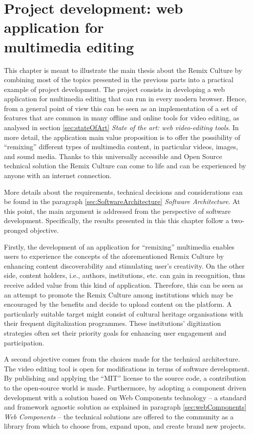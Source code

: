 \chapter{Project development: web application for \\ multimedia editing}
\label{ch:ch3_ProjectDevelopment}


This chapter is meant to illustrate the main thesis about the Remix Culture by combining most of the topics presented in the previous parts into a practical example of project development. The project consists in developing a web application for multimedia editing that can run in every modern browser. Hence, from a general point of view this can be seen as an implementation of a set of features that are common in many offline and online tools for video editing, as analysed in section \ref{sec:stateOfArt} \emph{State of the art: web video-editing tools}. In more detail, the application main value proposition is to offer the possibility of “remixing” different types of multimedia content, in particular videos, images, and sound media. Thanks to this universally accessible and Open Source technical solution the Remix Culture can come to life and can be experienced by anyone with an internet connection.

More details about the requirements, technical decisions and considerations can be found in the paragraph \ref{sec:SoftwareArchitecture} \emph{Software Architecture}. At this point, the main argument is addressed from the perspective of software development. Specifically, the results presented in this this chapter follow a two-pronged objective.

Firstly, the development of an application for “remixing” multimedia enables users to experience the concepts of the aforementioned Remix Culture by enhancing content discoverability and stimulating user’s creativity. On the other side, content holders, i.e., authors, institutions, etc. can gain in recognition, thus receive added value from this kind of application. Therefore, this can be seen as an attempt to promote the Remix Culture among institutions which may be encouraged by the benefits and decide to upload content on the platform. A particularly suitable target might consist of cultural heritage organisations with their frequent digitalization programmes. These institutions’ digitization strategies often set their priority goals for enhancing user engagement and participation.

A second objective comes from the choices made for the technical architecture. The video editing tool is open for modifications in terms of software development. By publishing and applying the “MIT” license to the source code, a contribution to the open-source world is made. Furthermore, by adopting a component driven development with a solution based on Web Components technology – a standard and framework agnostic solution as explained in paragraph \ref{sec:webComponents} \emph{Web Components} – the technical solutions are offered to the community as a library from which to choose from, expand upon, and create brand new projects.

